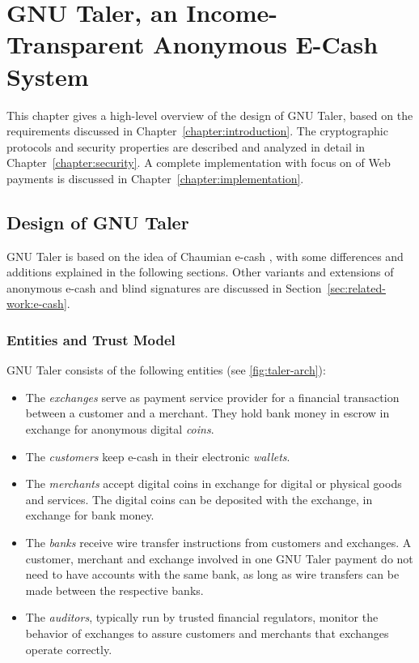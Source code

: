 



\chapter{GNU Taler, an Income-Transparent Anonymous E-Cash System}\label{chapter:design}

This chapter gives a high-level overview of the design of GNU Taler, based on
the requirements discussed in Chapter~\ref{chapter:introduction}.  The
cryptographic protocols and security properties are described and analyzed in detail in
Chapter~\ref{chapter:security}.  A complete implementation with focus on of Web
payments is discussed in Chapter~\ref{chapter:implementation}.


\section{Design of GNU Taler}

GNU Taler is based on the idea of Chaumian e-cash \cite{chaum1983blind}, with
some differences and additions explained in the following sections.  Other
variants and extensions of anonymous e-cash and blind signatures are discussed in
Section~\ref{sec:related-work:e-cash}.


\subsection{Entities and Trust Model}
GNU Taler consists of the following entities (see \ref{fig:taler-arch}):
\begin{itemize}
  \item The \emph{exchanges} serve as payment service provider for a
    financial transaction between a customer and a merchant. They hold bank money
    in escrow in exchange for anonymous digital \emph{coins}.
  \item The \emph{customers} keep e-cash in their electronic \emph{wallets}.
  \item The \emph{merchants} accept digital coins in exchange for digital or physical
    goods and services.  The digital coins can be deposited with the exchange,
    in exchange for bank money.
  \item The \emph{banks} receive wire transfer instructions from customers
    and exchanges.  A customer, merchant and exchange involved in one
    GNU Taler payment do not need to have accounts with the same bank,
    as long as wire transfers can be made between the respective banks.
  \item The \emph{auditors}, typically run by trusted financial regulators,
    monitor the behavior of exchanges to assure customers and merchants that
    exchanges operate correctly.
\end{itemize}


